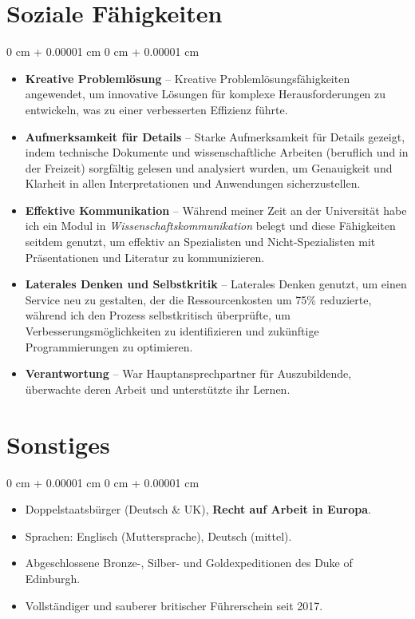 \documentclass[10pt, letterpaper]{article}
\newenvironment{highlights}{
    \begin{itemize}[
        topsep=0.2 cm,
        parsep=0.2 cm,
        partopsep=0pt,
        itemsep=0.025 cm,
        leftmargin=0 cm + 10pt
    ]
}{
    \end{itemize}
}
\newenvironment{onecolentry}{
    \begin{adjustwidth}{
        0 cm + 0.00001 cm
    }{
        0 cm + 0.00001 cm
    }
}{
    \end{adjustwidth}
}
\begin{document}
        \vspace{0.15 cm}

    \section{Soziale Fähigkeiten}

        \begin{onecolentry}
            \begin{highlights}
                \item \textbf{Kreative Problemlösung} -- Kreative Problemlösungsfähigkeiten angewendet, um innovative Lösungen für komplexe Herausforderungen zu entwickeln, was zu einer verbesserten Effizienz führte.
                \item \textbf{Aufmerksamkeit für Details} -- Starke Aufmerksamkeit für Details gezeigt, indem technische Dokumente und wissenschaftliche Arbeiten (beruflich und in der Freizeit) sorgfältig gelesen und analysiert wurden, um Genauigkeit und Klarheit in allen Interpretationen und Anwendungen sicherzustellen.
                \item \textbf{Effektive Kommunikation} -- Während meiner Zeit an der Universität habe ich ein Modul in \textit{Wissenschaftskommunikation} belegt und diese Fähigkeiten seitdem genutzt, um effektiv an Spezialisten und Nicht-Spezialisten mit Präsentationen und Literatur zu kommunizieren.
                \item \textbf{Laterales Denken und Selbstkritik} -- Laterales Denken genutzt, um einen Service neu zu gestalten, der die Ressourcenkosten um 75\% reduzierte, während ich den Prozess selbstkritisch überprüfte, um Verbesserungsmöglichkeiten zu identifizieren und zukünftige Programmierungen zu optimieren.
                \item \textbf{Verantwortung} -- War Hauptansprechpartner für Auszubildende, überwachte deren Arbeit und unterstützte ihr Lernen.
            \end{highlights}
        \end{onecolentry}

        \vspace{0.15 cm}

    \section{Sonstiges}

        \begin{onecolentry}
            \begin{highlights}
            \item Doppelstaatsbürger (Deutsch \& UK), \textbf{Recht auf Arbeit in Europa}.
                \item Sprachen: Englisch (Muttersprache), Deutsch (mittel).
                \item Abgeschlossene Bronze-, Silber- und Goldexpeditionen des Duke of Edinburgh.
                \item Vollständiger und sauberer britischer Führerschein seit 2017.
            \end{highlights}
        \end{onecolentry}
\end{document}
